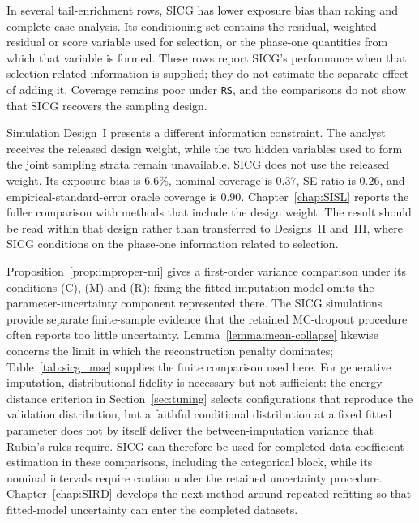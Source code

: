 In several tail-enrichment rows, SICG has lower exposure bias than raking and complete-case analysis. Its conditioning set contains the residual, weighted residual or score variable used for selection, or the phase-one quantities from which that variable is formed. These rows report SICG's performance when that selection-related information is supplied; they do not estimate the separate effect of adding it. Coverage remains poor under \texttt{RS}, and the comparisons do not show that SICG recovers the sampling design.

Simulation Design~I presents a different information constraint. The analyst receives the released design weight, while the two hidden variables used to form the joint sampling strata remain unavailable. SICG does not use the released weight. Its exposure bias is \(6.6\%\), nominal coverage is \(0.37\), SE ratio is \(0.26\), and empirical-standard-error oracle coverage is \(0.90\). Chapter~\ref{chap:SISL} reports the fuller comparison with methods that include the design weight. The result should be read within that design rather than transferred to Designs~II and~III, where SICG conditions on the phase-one information related to selection.

Proposition~\ref{prop:improper-mi} gives a first-order variance comparison under its conditions (C), (M) and (R): fixing the fitted imputation model omits the parameter-uncertainty component represented there. The SICG simulations provide separate finite-sample evidence that the retained MC-dropout procedure often reports too little uncertainty. Lemma~\ref{lemma:mean-collapse} likewise concerns the limit in which the reconstruction penalty dominates; Table~\ref{tab:sicg_mse} supplies the finite comparison used here. For generative imputation, distributional fidelity is necessary but not sufficient: the energy-distance criterion in Section~\ref{sec:tuning} selects configurations that reproduce the validation distribution, but a faithful conditional distribution at a fixed fitted parameter does not by itself deliver the between-imputation variance that Rubin's rules require. SICG can therefore be used for completed-data coefficient estimation in these comparisons, including the categorical block, while its nominal intervals require caution under the retained uncertainty procedure. Chapter~\ref{chap:SIRD} develops the next method around repeated refitting so that fitted-model uncertainty can enter the completed datasets.
